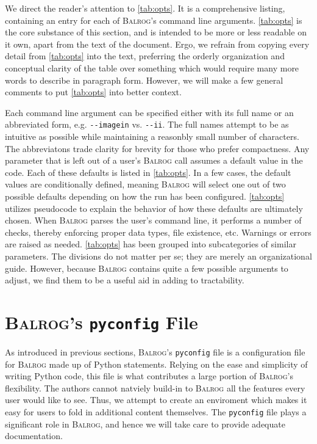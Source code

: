 \documentclass[12pt]{book}
\newcommand{\codett}[1]{\lstinline{#1}}
\newcommand{\py}{Python}
\newcommand{\pyconfig}{\codett{pyconfig}}
\newcommand{\balrog}{\textsc{Balrog}}
\newcommand{\opt}[1]{\codett{--#1}}
\begin{document}
We direct the reader's attention to \autoref{tab:opts}.
It is a comprehensive listing, containing an entry for each of \balrog{}'s command line arguments.
\autoref{tab:opts} is the core substance of this section,
and is intended to be more or less readable on it own, apart from the text of the document.
Ergo, we refrain from copying every detail from \autoref{tab:opts} into the text, 
preferring the orderly organization and conceptual clarity
of the table over something which would require many more words to describe in paragraph form.
However, we will make a few general comments to put \autoref{tab:opts} into better context.

Each command line argument can be specified either with its full name or an abbreviated form, e.g. \opt{imagein} vs. \opt{ii}.
The full names attempt to be as intuitive as possible while maintaining a reasonbly small number of characters.
The abbreviatons trade clarity for brevity for those who prefer compactness. 
Any parameter that  is left out of a user's \balrog{} call assumes a default value in the code.
Each of these defaults is listed in \autoref{tab:opts}. 
In a few cases, the default values are conditionally defined, meaning \balrog{} will select one out of
two possible defaults depending on how the run has been configured.
\autoref{tab:opts} utilizes pseudocode to explain the behavior of how these defaults are ultimately chosen.
When \balrog{} parses the user's command line, it performs a number of checks, 
thereby enforcing proper data types, file existence, etc.
Warnings or errors are raised as needed.
\autoref{tab:opts} has been grouped into subcategories of similar parameters.
The divisions do not matter per se; they are merely an organizational guide.
However, because \balrog{} contains quite a few possible arguments to adjust,
we find them to be a useful aid in adding to tractability.

\newpage
\optstab{}


\chapter{\balrog{}'s \texttt{pyconfig} File}
\label{sec:pyconfig}

As introduced in previous sections, \balrog{}'s \pyconfig{} file is a configuration file for \balrog{} made up of \py{} statements.
Relying on the ease and simplicity of writing \py{} code, this file is what contributes a large portion of \balrog{}'s flexibility.
The authors cannot natviely build-in to \balrog{} all the features every user would like to see.
Thus, we attempt to create an enviroment which makes it easy for users to fold in additional content themselves.
The \pyconfig{} file plays a significant role in \balrog{}, and hence we will take care to provide adequate documentation.
\end{document}
